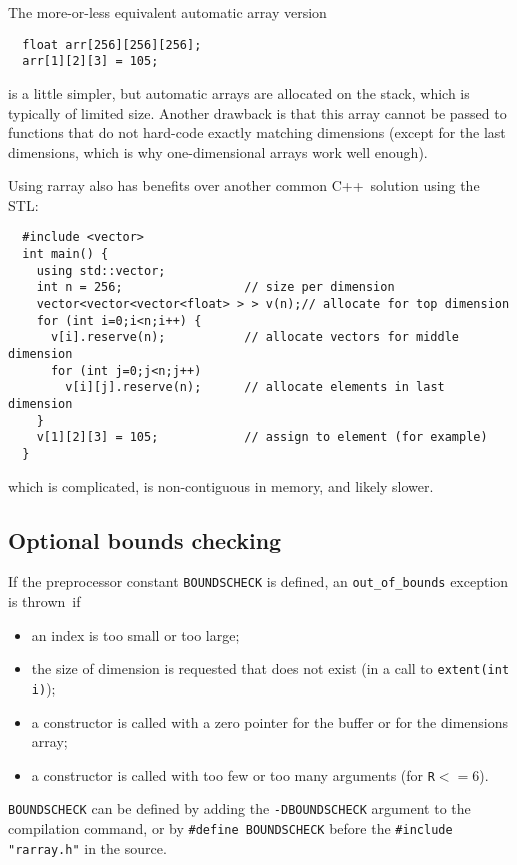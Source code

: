\documentclass[12pt,twoside]{article}
\newcommand{\cxx}{C{++}}
\begin{document}
The more-or-less equivalent automatic array version 
\vspace{-5pt}\begin{framed}\vspace{-14pt}%
\begin{verbatim}
  float arr[256][256][256]; 
  arr[1][2][3] = 105;
\end{verbatim}
\vspace{-14pt}\end{framed}
\noindent
is a little simpler, but automatic arrays are allocated on the stack,
which is typically of limited size. Another drawback is that this array cannot be passed to functions that do
not hard-code exactly matching dimensions (except for the last
dimensions, which is why one-dimensional arrays work well enough).

Using rarray also has benefits over another common \cxx\ 
solution using the STL:
\vspace{-5pt}\begin{framed}\vspace{-14pt}%
\begin{verbatim}
  #include <vector>
  int main() {
    using std::vector;
    int n = 256;                 // size per dimension
    vector<vector<vector<float> > > v(n);// allocate for top dimension
    for (int i=0;i<n;i++) {
      v[i].reserve(n);           // allocate vectors for middle dimension
      for (int j=0;j<n;j++) 
        v[i][j].reserve(n);      // allocate elements in last dimension
    }
    v[1][2][3] = 105;            // assign to element (for example)
  }
\end{verbatim}
\vspace{-14pt}\end{framed}\vspace{-8pt}
\noindent
which is complicated, is non-contiguous in memory, and likely
slower. 

\subsection{Optional bounds checking}

If the preprocessor constant \texttt{{\tt BOUNDSCHECK}} is defined, an
\texttt{out\_of\_bounds} exception is thrown~if
\begin{itemize}\itemsep0pt\parskip3pt
\item an index is too small or too large;
\item the size of dimension is requested that does not exist (in a call to \texttt{extent(int i)});
\item a constructor is called with a zero pointer for the buffer or for the dimensions array;
\item a constructor is called with too few or too many arguments (for \texttt{R}$<=6$).
\end{itemize}
\texttt{{\tt BOUNDSCHECK}} can be defined by
adding the {\tt -DBOUNDSCHECK} argument to the compilation command, or
by \texttt{{\tt\#define BOUNDSCHECK}} before
the \texttt{{\tt\#include "rarray.h"}} in the source.
\end{document}
